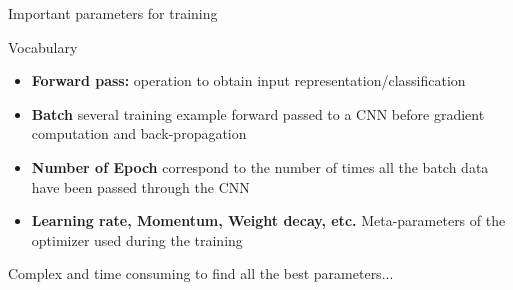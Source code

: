 \begin{frame}{Important parameters for training}

	\begin{block}{Vocabulary}
        \begin{itemize}
        	\item \textbf{Forward pass:} operation to obtain input representation/classification
        	\item \textbf{Batch} several training example forward passed to a CNN before gradient computation and back-propagation
        	\item \textbf{Number of Epoch} correspond to the number of times all the batch data have been passed through the CNN
        	\item \textbf{Learning rate, Momentum, Weight decay, etc.} Meta-parameters of the optimizer used during the training
        \end{itemize}
	\end{block}	
	\vfill
	Complex and time consuming to find all the best parameters...
\end{frame}